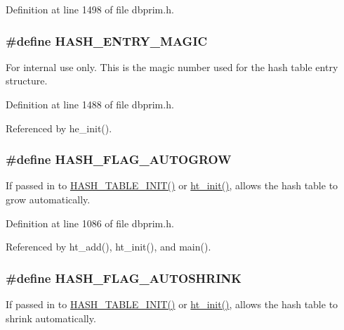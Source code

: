 Definition at line 1498 of file dbprim.h.\hypertarget{group__dbprim__hash_ga36}{
\subsubsection[HASH\_\-ENTRY\_\-MAGIC]{\setlength{\rightskip}{0pt plus 5cm}\#define HASH\_\-ENTRY\_\-MAGIC}}
\label{group__dbprim__hash_ga36}


\begin{Desc}
\item[For internal use only.]
This is the magic number used for the hash table entry structure.\end{Desc}


Definition at line 1488 of file dbprim.h.

Referenced by he\_\-init().\hypertarget{group__dbprim__hash_ga22}{
\subsubsection[HASH\_\-FLAG\_\-AUTOGROW]{\setlength{\rightskip}{0pt plus 5cm}\#define HASH\_\-FLAG\_\-AUTOGROW}}
\label{group__dbprim__hash_ga22}


If passed in to \hyperlink{group__dbprim__hash_ga25}{HASH\_\-TABLE\_\-INIT()} or \hyperlink{group__dbprim__hash_ga9}{ht\_\-init()}, allows the hash table to grow automatically.

Definition at line 1086 of file dbprim.h.

Referenced by ht\_\-add(), ht\_\-init(), and main().\hypertarget{group__dbprim__hash_ga23}{
\subsubsection[HASH\_\-FLAG\_\-AUTOSHRINK]{\setlength{\rightskip}{0pt plus 5cm}\#define HASH\_\-FLAG\_\-AUTOSHRINK}}
\label{group__dbprim__hash_ga23}


If passed in to \hyperlink{group__dbprim__hash_ga25}{HASH\_\-TABLE\_\-INIT()} or \hyperlink{group__dbprim__hash_ga9}{ht\_\-init()}, allows the hash table to shrink automatically.

